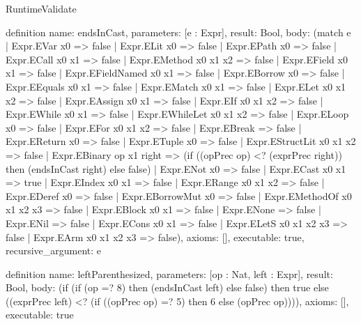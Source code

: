 \begin{lexlean}{RuntimeValidate}
\begin{semanticmodule}
definition{
  name: endsInCast,
  parameters: [e : Expr],
  result: Bool,
  body: (match e
    | Expr.EVar x0 => false
    | Expr.ELit x0 => false
    | Expr.EPath x0 => false
    | Expr.ECall x0 x1 => false
    | Expr.EMethod x0 x1 x2 => false
    | Expr.EField x0 x1 => false
    | Expr.EFieldNamed x0 x1 => false
    | Expr.EBorrow x0 => false
    | Expr.EEquals x0 x1 => false
    | Expr.EMatch x0 x1 => false
    | Expr.ELet x0 x1 x2 => false
    | Expr.EAssign x0 x1 => false
    | Expr.EIf x0 x1 x2 => false
    | Expr.EWhile x0 x1 => false
    | Expr.EWhileLet x0 x1 x2 => false
    | Expr.ELoop x0 => false
    | Expr.EFor x0 x1 x2 => false
    | Expr.EBreak => false
    | Expr.EReturn x0 => false
    | Expr.ETuple x0 => false
    | Expr.EStructLit x0 x1 x2 => false
    | Expr.EBinary op x1 right => (if ((opPrec op) <? (exprPrec right)) then (endsInCast right) else false)
    | Expr.ENot x0 => false
    | Expr.ECast x0 x1 => true
    | Expr.EIndex x0 x1 => false
    | Expr.ERange x0 x1 x2 => false
    | Expr.EDeref x0 => false
    | Expr.EBorrowMut x0 => false
    | Expr.EMethodOf x0 x1 x2 x3 => false
    | Expr.EBlock x0 x1 => false
    | Expr.ENone => false
    | Expr.ENil => false
    | Expr.ECons x0 x1 => false
    | Expr.ELetS x0 x1 x2 x3 => false
    | Expr.EArm x0 x1 x2 x3 => false),
  axioms: [],
  executable: true,
  recursive_argument: e
}

definition{
  name: leftParenthesized,
  parameters: [op : Nat, left : Expr],
  result: Bool,
  body: (if (if (op =? 8) then (endsInCast left) else false) then true else ((exprPrec left) <? (if ((opPrec op) =? 5) then 6 else (opPrec op)))),
  axioms: [],
  executable: true
}


\end{semanticmodule}
\end{lexlean}
